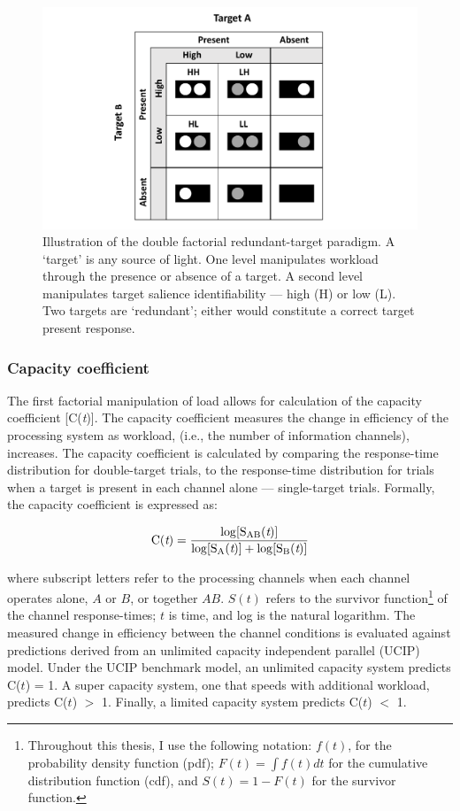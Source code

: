 \begin{figure}[tbh]
\centering \includegraphics[scale = .6]{Figures/Intro/DFP.pdf}
\caption{Illustration of the double factorial redundant-target paradigm. A `target' is any source of light. One level manipulates workload through the presence or absence of a target. A second level manipulates target salience \ie identifiability --- high (H) or low (L). Two targets are `redundant'; either would constitute a correct target present response.}
\label{fig:Ch1_DFP}
\end{figure}

\subsubsection{Capacity coefficient}
The first factorial manipulation of load allows for calculation of the capacity coefficient [C(\textit{t})]. The capacity coefficient measures the change in efficiency of the processing system as workload, (i.e., the number of information channels), increases. The capacity coefficient is calculated by comparing the response-time distribution for double-target trials, to the response-time distribution for trials when a target is present in each channel alone --- single-target trials. Formally, the capacity coefficient is expressed as:

\begin{equation}
	\rm C({\rm \textit{t}}) = \frac{\log[S_{AB}({\rm \textit{t}})]}{\log[S_{A}({\rm \textit{t}})] + \log[S_{B}({\rm \textit{t}})]}
    \label{eq:Ct}
\end{equation}

\noindent
where subscript letters refer to the processing channels when each channel operates alone, $A$ or $B$, or together $AB$. $S(t)$ refers to the survivor function\footnote{Throughout this thesis, I use the following notation: $f(t)$, for the probability density function (pdf); $F(t) = \int{f(t)dt}$ for the cumulative distribution function (cdf), and $S(t) = 1 - F(t)$ for the survivor function.} of the channel response-times; $t$ is time, and log is the natural logarithm. The measured change in efficiency between the channel conditions is evaluated against predictions derived from an unlimited capacity independent parallel (UCIP) model. Under the UCIP benchmark model, an unlimited capacity system predicts C($t$) = 1. A super capacity system, one that speeds with additional workload, predicts C($t$) $>$ 1. Finally, a limited capacity system predicts C($t$) $<$ 1. 

